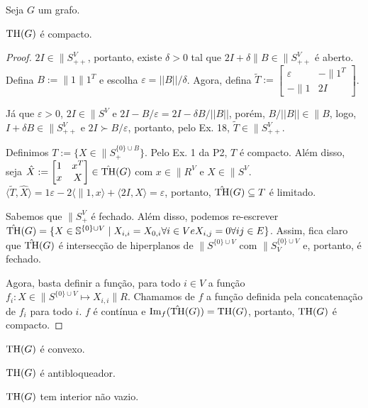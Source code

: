 \begin{homeworkProblemAnswer}
Seja $G$ um grafo.
\begin{prop}
$\textrm{TH}(G)$ é compacto.
\end{prop}
\begin{proof}
$2I \in \|{S}_{++}^V$, portanto, existe $\delta > 0$ tal que $2I + \delta \|{B} \in \|{S}_{++}^V$ é aberto. Defina $B := \|{1}\|{1}^T$ e escolha $\varepsilon = ||B||/\delta$. Agora, defina $\tilde{T} := \begin{bmatrix}
\varepsilon & -\|{1}^T \\
-\|{1} & 2I 
\end{bmatrix}$.  

Já que $\varepsilon > 0$, $2I \in \|{S}^V$ e $2I - B/\varepsilon = 2I - \delta B/||B||$, porém, $B/||B|| \in \|{B}$, logo, $I + \delta B \in \|{S}_{++}^V$ e $2I \succ B/\varepsilon$, portanto, pelo Ex. 18, $\tilde{T} \in \|{S}_{++}^V.$  

Definimos $T := \{X \in \|{S}_+^{\{0\}\cup B}\}$. Pelo Ex. 1 da P2, $T$ é compacto. Além disso, seja $\hat{X} := \begin{bmatrix}
1 & x^T \\
x & X
\end{bmatrix} \in \hat{\textrm{TH}}(G)$ com $x \in \|{R}^V$ e $X \in \|{S}^V$. $\langle \tilde{T}, \hat{X} \rangle = 1\varepsilon - 2 \langle \|{1}, x \rangle + \langle 2I, X \rangle = \varepsilon$, portanto, $\hat{\textrm{TH}}(G) \subseteq{T}$ é limitado.  

Sabemos que $\|{S}_+^V$ é fechado. Além disso, podemos re-escrever $\hat{\textrm{TH}}(G) = \{X \in \mathbb{S}^{\{0\}\cup V} \mid X_{i,i} = X_{0,i} \forall i \in V e X_{i,j} = 0 \forall ij \in E\}$. Assim, fica claro que $\hat{\textrm{TH}}(G)$ é intersecção de hiperplanos de $\|{S}^{\{0\}\cup V}$ com $\|{S}_V^{\{0\}\cup V}$ e, portanto, é fechado.  

Agora, basta definir a função, para todo $i \in V$ a função $f_i:X \in \|{S}^{\{0\}\cup V} \mapsto X_{i,i} \|{R}$. Chamamos de $f$ a função definida pela concatenação de $f_i$ para todo $i$. $f$ é contínua e $\textrm{Im}_f(\hat{\textrm{TH}}(G)) = \textrm{TH}(G)$, portanto, $\textrm{TH}(G)$ é compacto.
\end{proof}

\begin{prop}
$\textrm{TH}(G)$ é convexo.
\end{prop}

\begin{prop}
$\textrm{TH}(G)$ é antibloqueador.
\end{prop}

\begin{prop}
$\textrm{TH}(G)$ tem interior não vazio.
\end{prop}

\end{homeworkProblemAnswer}


